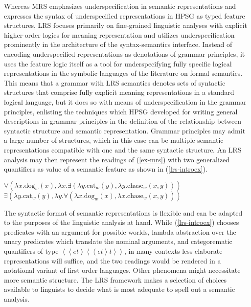\documentclass[output=paper]{langsci/langscibook}
\begin{document}
Whereas MRS emphasizes underspecification in semantic representations and expresses the syntax of underspecified representations in HPSG as typed feature structures, LRS focuses primarily on fine-grained linguistic analyses with explicit higher-order logics for meaning representation and utilizes underspecification prominently in the architecture of the syntax-semantics interface. Instead of encoding underspecified representations as denotations of grammar principles, it uses the feature logic itself as a tool for underspecifying fully specific logical representations in the symbolic languages of the literature on formal semantics. This means that a grammar with LRS semantics denotes sets of syntactic structures that comprise fully explicit meaning representations in a standard logical language, but it does so with means of underspecification in the grammar principles, enlisting the techniques which HPSG developed for writing general descriptions in grammar principles in the definition of the relationship between syntactic structure and semantic representation. Grammar principles may admit a large number of structures, which in this case can be multiple semantic representations compatible with one and the same syntactic structure. An LRS analysis may then represent the readings of (\ref{ex-mrs}) with two generalized quantifiers as value of a semantic feature as shown in (\ref{lrs-introex}).

\begin{exe}
  \ex\label{lrs-introex}
\begin{xlist}
  \ex\label{lrs-introex1a}
  $\forall \left(\lambda x.\mathrm{dog}_w(x),\lambda x.\exists \left(\lambda y.\mathrm{cat}_w(y),\lambda y.\mathrm{chase}_w(x,y)\right)\right)$ 
  \ex\label{lrs-introex1b}
  $\exists \left(\lambda y.\mathrm{cat}_w(y),\lambda y.\forall \left(\lambda x.\mathrm{dog}_w(x),\lambda x.\mathrm{chase}_w(x,y)\right)\right)$ 
\end{xlist}
\end{exe}


The syntactic format of semantic representations is flexible and can be adapted to the purposes of the linguistic analysis at hand. While (\ref{lrs-introex}) chooses predicates with an argument for possible worlds, lambda abstraction over the unary predicates which translate the nominal arguments, and categorematic quantifiers of type ${\left<\left<et\right>\left<\left<et\right>t\right>\right>}$, in many contexts less elaborate representations will suffice, and the two readings would be rendered in a notational variant of first order languages. Other phenomena might necessitate more semantic structure. The LRS framework makes a selection of choices available to linguists to decide what is most adequate to spell out a semantic analysis.
\end{document}

